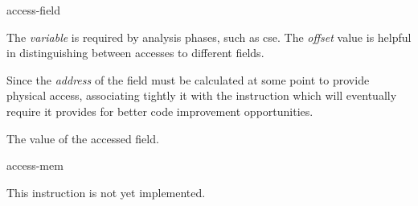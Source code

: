 \begin{instruction}{access-field}\label{memory-access:field}


  \begin{notes}
    The \emph{variable} is required by analysis phases, such as
    \ac{cse}.  The \emph{offset} value is helpful in distinguishing
    between accesses to different fields.

    Since the \emph{address} of the field must be calculated at some
    point to provide physical access, associating tightly it with the
    instruction which will eventually require it provides for better
    code improvement opportunities.
  \end{notes}

  \begin{results}
  \item The value of the accessed field.
  \end{results}

  \begin{operands}
  \item {}
  \item {}
  \item {}
  \end{operands}

  \begin{seealso}
  \end{seealso}
\end{instruction}

\begin{instruction}{access-mem}
  \begin{notes}
    This instruction is not yet implemented.
  \end{notes}
\end{instruction}

